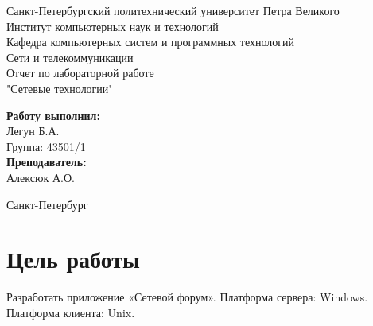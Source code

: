 \documentclass[a4paper,12pt]{extarticle}
\begin{document}
	\begin{center}		%

		\large Санкт-Петербургский политехнический университет Петра Великого\\
		\large Институт компьютерных наук и технологий \\
		\large Кафедра компьютерных систем и программных технологий\\[5cm]
		
		\huge Сети и телекоммуникации\\[0.5cm] %
		\large Отчет по лабораторной работе\\[0.1cm]
		\large "Сетевые технологии"\\[4cm]

	\end{center}
	\begin{flushright} %
		\begin{minipage}{0.35\textwidth} %
			\begin{flushleft} %

				\large\textbf{Работу выполнил:}\\
				\large Легун Б.А.\\
				\large {Группа:} 43501/1\\
				
				\large \textbf{Преподаватель:}\\
				\large Алексюк А.О.\\

			\end{flushleft}
		\end{minipage}
	\end{flushright}
	
	\vfill %

	\begin{center}
	\large Санкт-Петербург\\
	\large \the\year %
	\end{center} %

\thispagestyle{empty} %
\newpage
\section{Цель работы}
Разработать приложение «Сетевой форум».
Платформа сервера: Windows.
Платформа клиента: Unix.
\end{document}
